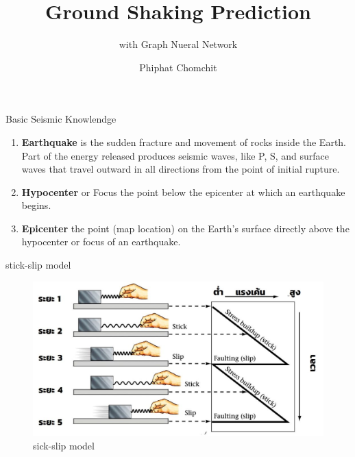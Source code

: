 \documentclass{beamer}
\title{Ground Shaking Prediction}
\subtitle{with Graph Nueral Network}
\author{Phiphat Chomchit}
\institute{Chiang Mai University}
\newcounter{saveenumi}
\newcommand{\seti}{\setcounter{saveenumi}{\value{enumi}}}
\begin{document}
	
	\begin{frame}
		\titlepage
	\end{frame}
	
	\begin{frame}[t]{Basic Seismic Knowlendge}
		
		\begin{enumerate}
			\item \textbf{Earthquake} is the sudden fracture and movement of rocks inside the Earth. 
			Part of the energy released produces seismic waves, like P, S, and surface waves that 
			travel outward in all directions from the point of initial rupture.
			\item \textbf{Hypocenter} or Focus the point below the epicenter at which an earthquake
			begins.
			\item \textbf{Epicenter} the point (map location) on the Earth’s surface directly above 
			the hypocenter or focus of an earthquake.
			\seti
		\end{enumerate}
		
	\end{frame}
	
	\begin{frame}[t]{stick-slip model}
		\begin{figure}
			\centering
			\includegraphics[scale=0.5]{stick.jpg}
			\caption{sick-slip model}
		\end{figure}
	\end{frame}
	
\end{document}
